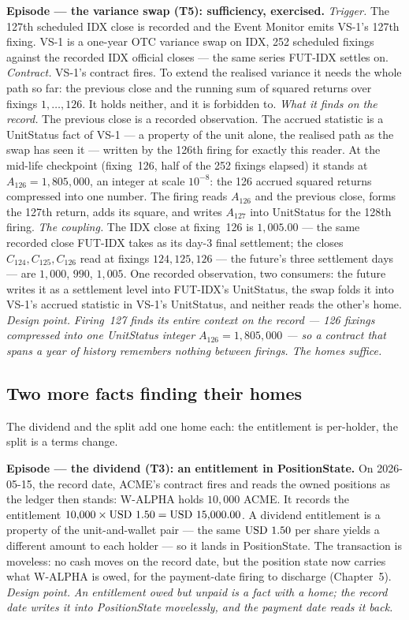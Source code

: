 \medskip\noindent\textbf{Episode --- the variance swap (T5): sufficiency, exercised.}
\emph{Trigger.} The 127th scheduled IDX close is recorded and the Event Monitor emits
VS-1's 127th fixing. VS-1 is a one-year OTC variance swap on IDX, 252 scheduled fixings
against the recorded IDX official closes --- the same series FUT-IDX settles on.
\emph{Contract.} VS-1's contract fires. To extend the realised variance it needs the whole
path so far: the previous close and the running sum of squared returns over fixings
$1,\dots,126$. It holds neither, and it is forbidden to.
\emph{What it finds on the record.} The previous close is a recorded observation. The
accrued statistic is a UnitStatus fact of VS-1 --- a property of the unit alone, the
realised path as the swap has seen it --- written by the 126th firing for exactly this
reader. At the mid-life checkpoint (fixing~126, half of the 252 fixings elapsed) it stands
at $A_{126}=1{,}805{,}000$, an integer at scale $10^{-8}$: the 126 accrued squared returns
compressed into one number. The firing reads $A_{126}$ and the previous close, forms the
127th return, adds its square, and writes $A_{127}$ into UnitStatus for the 128th firing.
\emph{The coupling.} The IDX close at fixing~126 is $1{,}005.00$ --- the same recorded
close FUT-IDX takes as its day-3 final settlement; the closes $C_{124},C_{125},C_{126}$ read
at fixings $124,125,126$ --- the future's three settlement days --- are $1{,}000$, $990$, $1{,}005$. One recorded observation, two
consumers: the future writes it as a settlement level into FUT-IDX's UnitStatus, the swap
folds it into VS-1's accrued statistic in VS-1's UnitStatus, and neither reads the other's
home.
\emph{Design point.} \emph{Firing~127 finds its entire context on the record --- 126
fixings compressed into one UnitStatus integer $A_{126}=1{,}805{,}000$ --- so a contract
that spans a year of history remembers nothing between firings. The homes suffice.}

\subsection{Two more facts finding their homes}

The dividend and the split add one home each: the entitlement is per-holder, the split is a
terms change.

\medskip\noindent\textbf{Episode --- the dividend (T3): an entitlement in PositionState.}
On 2026-05-15, the record date, ACME's contract fires and reads the owned positions as the
ledger then stands: W-ALPHA holds $10{,}000$ ACME. It records the entitlement
$10{,}000\times\mbox{USD~1.50}=\mbox{USD~15{,}000.00}$. A dividend entitlement is a property of the
unit-and-wallet pair --- the same $\mbox{USD~1.50}$ per share yields a different amount to each
holder --- so it lands in PositionState. The transaction is moveless: no cash moves on the
record date, but the position state now carries what W-ALPHA is owed, for the payment-date
firing to discharge (Chapter~5).
\emph{Design point.} \emph{An entitlement owed but unpaid is a fact with a home; the record
date writes it into PositionState movelessly, and the payment date reads it back.}


